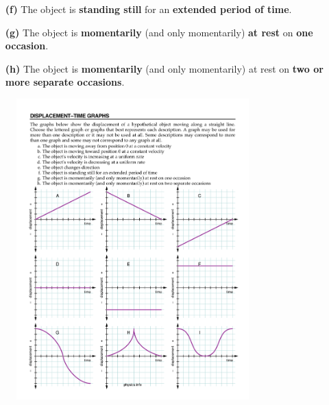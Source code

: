 \documentclass[A4,12pt]{article}
\begin{document}
\begin{enumerate}[label=\bfseries (\arabic*)]
\begin{itemize}
    \item[\bf (f)] The object is \textbf{standing still} for an \textbf{extended period of time}.
    \item[\bf (g)] The object is \textbf{momentarily} (and only momentarily) \textbf{at rest} on \textbf{one occasion}.
    \item[\bf (h)] The object is \textbf{momentarily} (and only momentarily) at rest on \textbf{two or more separate occasions}.
\end{itemize}
%
%
\begin{figure}[H]
    \centering
    \includegraphics[width=0.8\textwidth]{choose-displacement.pdf}

\end{figure}
\end{enumerate}
\end{document}
